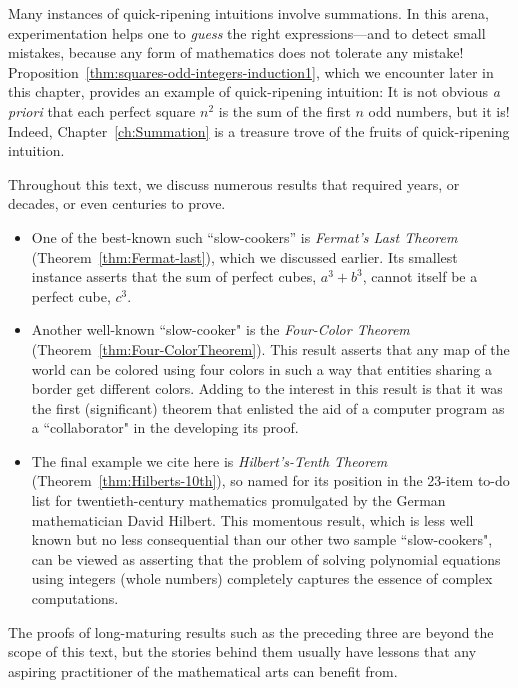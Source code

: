 \smallskip

Many instances of quick-ripening intuitions involve summations.  In this arena, experimentation helps one to \textit{guess} the right expressions---and to detect small mistakes, because any form of mathematics does not tolerate any mistake!  Proposition~\ref{thm:squares-odd-integers-induction1}, which we encounter later in this chapter, provides an example of quick-ripening intuition: It is not obvious {\em a priori} that each perfect square $n^2$ is the sum of the first $n$ odd numbers, but it is!  Indeed, Chapter~\ref{ch:Summation} is a treasure trove of the fruits of quick-ripening intuition.

\smallskip

Throughout this text, we discuss numerous results that required years, or decades, or even centuries to prove.
\begin{itemize}
\item
One of the best-known such ``slow-cookers'' is {\it Fermat's Last Theorem} (Theorem~\ref{thm:Fermat-last}), which we discussed earlier.  Its smallest instance asserts that the sum of perfect cubes, $a^3 + b^3$, cannot itself be a perfect cube, $c^3$.


\medskip\item
Another well-known ``slow-cooker" is the {\it Four-Color Theorem}
(Theorem~\ref{thm:Four-ColorTheorem}).  This result asserts that any map of the world can be colored using four colors in such a way that entities sharing a border get different colors.  Adding to the interest in this result is that it was the first (significant) theorem that enlisted the aid of a computer program as a ``collaborator" in the developing its proof.


\medskip\item
The final example we cite here is {\it Hilbert's-Tenth Theorem} (Theorem~\ref{thm:Hilberts-10th}), so named for its position in the 23-item to-do list for twentieth-century mathematics promulgated by the German mathematician David Hilbert.  This momentous result, which is less well known but no less consequential than our other two sample ``slow-cookers", can be viewed as asserting that the problem of solving polynomial equations using integers (whole numbers) completely captures the essence of complex computations.
  
\end{itemize}
The proofs of long-maturing results such as the preceding three are beyond the scope of this text, but the stories behind them usually have lessons that any aspiring practitioner of the mathematical arts can benefit from.

